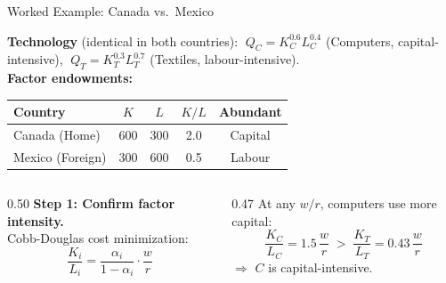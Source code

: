 \documentclass[aspectratio=169]{beamer}
\begin{document}

\begin{frame}[shrink=15]{Worked Example: Canada vs.\ Mexico}
\begin{worked}
\small\textbf{Technology} (identical in both countries):
$\;Q_C = K_C^{0.6}L_C^{0.4}$ (Computers, capital-intensive),
$\;Q_T = K_T^{0.3}L_T^{0.7}$ (Textiles, labour-intensive).\\[0.2em]
\textbf{Factor endowments:}
\begin{center}\small
\begin{tabular}{lcccc}
\toprule
\textbf{Country} & $K$ & $L$ & $K/L$ & \textbf{Abundant}\\
\midrule
Canada (Home) & 600 & 300 & 2.0 & Capital\\
Mexico (Foreign) & 300 & 600 & 0.5 & Labour\\
\bottomrule
\end{tabular}
\end{center}
\end{worked}
\vspace{0.2em}
\begin{columns}[T]
\begin{column}{0.50\textwidth}
\textbf{Step 1: Confirm factor intensity.}\\
Cobb-Douglas cost minimization:
\[\frac{K_i}{L_i} = \frac{\alpha_i}{1-\alpha_i}\cdot\frac{w}{r}\]
\end{column}
\begin{column}{0.47\textwidth}
At any $w/r$, computers use more capital:
\[\frac{K_C}{L_C} = 1.5\,\frac{w}{r} \;>\;
  \frac{K_T}{L_T} = 0.43\,\frac{w}{r}\]
\small$\Rightarrow$ $C$ is capital-intensive. \checkmark
\end{column}
\end{columns}
\end{frame}
\end{document}
